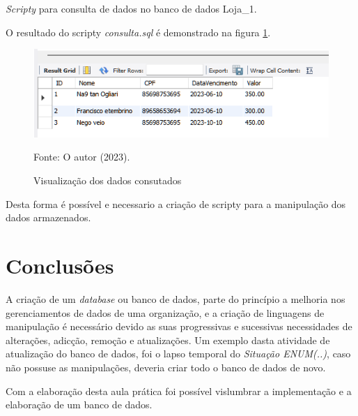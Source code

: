 \par \textit{Scripty} para consulta de dados no banco de dados Loja\_1.



\par O resultado do scripty \textit{consulta.sql} é demonstrado na figura \ref{fig:view}.

\begin{figure}[h!]
\caption{Visualização dos dados consutados}
\begin{center}
   \includegraphics[scale=1]{figure/view.png}
\end{center}
\label{fig:view}
{\fontsize{10pt}{\baselineskip}\selectfont
Fonte: O autor (2023).}
\end{figure}

\par Desta forma é possível e necessario a criação de scripty para a manipulação dos dados armazenados.


\section{Conclusões}
\par A criação de um \textit{database} ou banco de dados, parte do princípio a melhoria nos gerenciamentos de dados de uma organização, e a criação de linguagens de manipulação é necessário devido as suas progressivas e sucessivas necessidades de alterações, adicção, remoção e atualizações. Um exemplo dasta atividade de atualização do banco de dados, foi o lapso temporal do \textit{Situação ENUM(..)}, caso não possuse as manipulações, deveria criar todo o banco de dados de novo.
\par Com a elaboração desta aula prática foi possível vislumbrar a implementação e a elaboração de um banco de dados.
